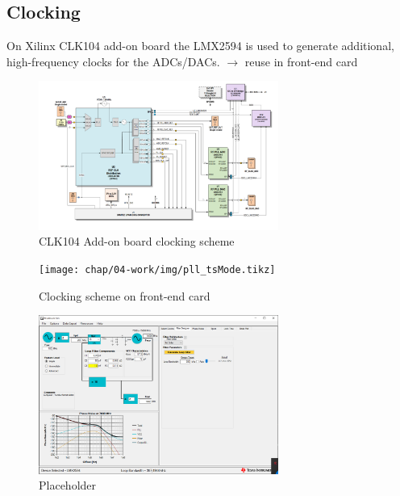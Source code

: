 \subsection{Clocking}
On Xilinx CLK104 add-on board the LMX2594 is used to generate additional, high-frequency clocks for the ADCs/DACs. $\rightarrow$ reuse in front-end card
\begin{figure}[tbh]
	\centering
	\includegraphics[width = 0.7\textwidth]{chap/04-work/img/clk104}
	\caption{CLK104 Add-on board clocking scheme}
	\label{fig:clk104}
\end{figure}

\begin{figure}[tbh]
	\centering
	\texttt{[image: chap/04-work/img/pll\_tsMode.tikz]}
	\caption{Clocking scheme on front-end card}
	\label{fig:clocking}
\end{figure}


\begin{figure}[tbh]
	\centering
	\includegraphics[width = 0.7\textwidth]{chap/04-work/img/pll.png}
	\caption{Placeholder}
	\label{fig:pll}
\end{figure}



